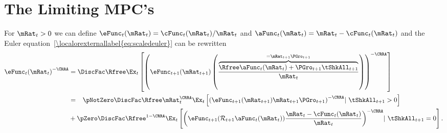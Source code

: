 \documentclass[\econtexRoot/BufferStockTheory]{subfiles}
\begin{document}
\hypertarget{The-Limiting-MPCs}{}
\section{The Limiting MPC's}\label{sec:MPCLimits}

For $\mRat_{t}>0$ we can define $\eFunc_{t}(\mRat_{t})=\cFunc_{t}(\mRat_{t})/\mRat_{t}$ and $\aFunc_{t}(\mRat_{t})=\mRat_{t}-\cFunc_{t}(\mRat_{t})$ and the Euler equation~\eqref{\localorexternallabel{eq:scaledeuler}} can be rewritten
\begin{equation}\begin{gathered}\begin{aligned}
 \eFunc_{t}{(\mRat_{t})}^{-\CRRA}  & = \DiscFac \Rfree \Ex_{t}\left[{\left(\eFunc_{t+1}({\mRat}_{t+1})\left(\frac{\overbrace{\Rfree \aFunc_{t}(\mRat_{t})+{\PGro}_{t+1}{\tShkAll}_{t+1}}^{=\mRat_{t+1}\PGro_{t+1}}}{\mRat_{t}}\right)\right)}^{-\CRRA }\right] \label{eq:eFuncEuler}
\\  & = \phantom{ + }\pNotZero \DiscFac \Rfree \mRat_{t}^{\CRRA} \Ex_{t}\left[ {\left(\eFunc_{t+1}(\mRat_{t+1}) \mRat_{t+1}\PGro_{t+1}\right)}^{-\CRRA} |~ \tShkAll_{t+1}>0 \right] \notag
\\ &  + \pZero  \DiscFac \Rfree^{1-\CRRA} \Ex_{t}\left[{\left(\eFunc_{t+1}(\mathcal{R}_{t+1}\aFunc_{t}(\mRat_{t}))\frac{\mRat_t-\cFunc_{t}(\mRat_{t})}{\mRat_{t}}\right)}^{-\CRRA} |~ \tShkAll_{t+1} = 0 \right]   .
\end{aligned}\end{gathered}\end{equation}
\end{document}
